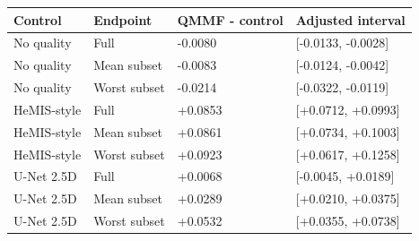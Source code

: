\begin{tabular}{llll}
\toprule
Control & Endpoint & QMMF - control & Adjusted interval \\
\midrule
No quality & Full & -0.0080 & [-0.0133, -0.0028] \\
No quality & Mean subset & -0.0083 & [-0.0124, -0.0042] \\
No quality & Worst subset & -0.0214 & [-0.0322, -0.0119] \\
HeMIS-style & Full & +0.0853 & [+0.0712, +0.0993] \\
HeMIS-style & Mean subset & +0.0861 & [+0.0734, +0.1003] \\
HeMIS-style & Worst subset & +0.0923 & [+0.0617, +0.1258] \\
U-Net 2.5D & Full & +0.0068 & [-0.0045, +0.0189] \\
U-Net 2.5D & Mean subset & +0.0289 & [+0.0210, +0.0375] \\
U-Net 2.5D & Worst subset & +0.0532 & [+0.0355, +0.0738] \\
\bottomrule
\end{tabular}

